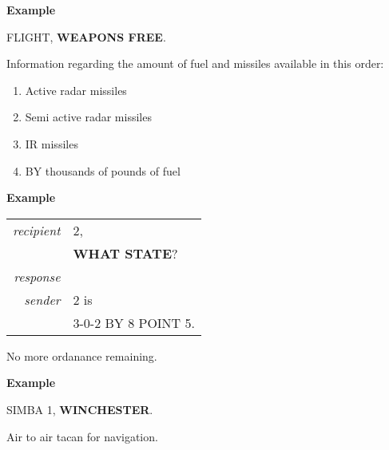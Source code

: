 \begin{tcoloritemize}
    \medskip
    \textbf{Example}
    \begin{center}
        \begin{minipage}{0.9\textwidth}
            FLIGHT, \textbf{WEAPONS FREE}.
        \end{minipage}
    \end{center}

    Information regarding the amount of fuel and missiles available in this order:
    \begin{enumerate}
        \item Active radar missiles
        \item Semi active radar missiles
        \item IR missiles
        \item BY thousands of pounds of fuel
    \end{enumerate}

    \medskip
    \textbf{Example}
    \begin{center}
        \begin{tabular}{>{\itshape}r l}
            recipient & 2, \\
            & \textbf{WHAT STATE}? \\
            response \\
            sender & 2 is   \\
            & 3-0-2 BY 8 POINT 5. \\
        \end{tabular}
    \end{center}

    \blueitem[WINCHESTER]
    No more ordanance remaining.

    \medskip
    \textbf{Example}
    \begin{center}
        \begin{minipage}{0.9\textwidth}
            SIMBA 1, \textbf{WINCHESTER}.
        \end{minipage}
    \end{center}

    \blueitem[YARDSTICK]
    Air to air tacan for navigation.

\end{tcoloritemize}